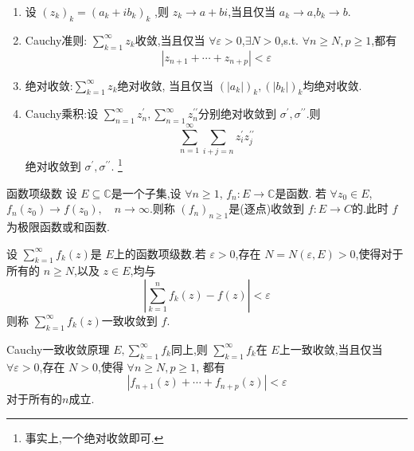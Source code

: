 \documentclass[../../复变函数.tex]{subfiles}
\begin{document}
\begin{proposition}
    \begin{enumerate}
        \item 设 \(  \left( z_{k} \right)_{k}= \left( a_{k}+ ib_{k} \right)_{k}    \) ,则 \(  z_{k}\to a+ bi  \),当且仅当 \(  a_{k}\to a  \),\(  b_{k}\to b  \).   
        \item {Cauchy准则}: \(  \sum _{k= 1}^{\infty}z_{k}  \)收敛,当且仅当 \(  \forall  \varepsilon > 0  \),\(  \exists N> 0  \),s.t. \(  \forall n\ge N, p\ge 1  \),都有 \[
        \left| z_{n+ 1}+ \cdots + z_{n+ p} \right|< \varepsilon  
        \]    
        \item 绝对收敛:\(  \sum _{k= 1}^{\infty}z_{k}  \)绝对收敛, 当且仅当 \(  \left( \left| a_{k} \right|  \right)_{k},\left( \left| b_{k} \right|  \right)  _{k}  \)均绝对收敛. 
        \item Cauchy乘积:设 \(  \sum _{n =  1}^{\infty}z_{n}^{\prime} , \sum _{n = 1}^{\infty} z_{n}^{\prime \prime}   \)分别绝对收敛到 \(   \sigma ^{\prime} , \sigma ^{\prime \prime}   \).则 \[
        \sum _{n = 1}^{\infty}\sum _{i+ j = n}z_{i}^{\prime} z_{j}^{\prime \prime} 
        \] 绝对收敛到 \(   \sigma ^{\prime} , \sigma ^{\prime \prime}   \). \footnote{事实上,一个绝对收敛即可.}
    \end{enumerate}
    
\end{proposition}


\begin{definition}{函数项级数}
    设 \(  E\subseteq \mathbb{C}   \)是一个子集,设 \(  \forall  n\ge 1  \), \(  f_{n}:E\to \mathbb{C}   \)是函数.   若 \(  \forall z_0 \in E  \), \(  f_{n}\left( z_0 \right)\to f\left( z_0 \right),\quad n\to \infty    \).则称 \(  \left( f_{n} \right)_{n\ge 1}   \)是(逐点)收敛到 \(  f:E\to C  \)的.此时 \(  f  \)为极限函数或和函数.     

\end{definition}

\begin{definition}
    设 \(  \sum _{k= 1}^{\infty}f_{k}\left( z \right)   \)是 \(  E  \)上的函数项级数.若 \(   \varepsilon > 0  \),存在 \(  N =  N\left(  \varepsilon ,E \right)> 0   \),使得对于所有的 \(  n\ge N  \),以及 \(  z \in E  \),均与 \[
    \left| \sum _{k= 1}^{n}f_{k}\left( z \right)-f\left( z \right)   \right|<  \varepsilon  
    \]则称 \(  \sum _{k= 1}^{\infty}f_{k}\left( z \right)   \)一致收敛到 \(  f  \).        
\end{definition}


\begin{theorem}{Cauchy一致收敛原理}
     \(  E, \sum _{k= 1}^{\infty}f_{k}  \)同上,则 \(  \sum _{k= 1}^{\infty}f_{k}  \)在 \(  E  \)上一致收敛,当且仅当 \(  \forall  \varepsilon > 0  \),存在 \(  N> 0  \),使得 \(  \forall n\ge N,p\ge 1  \),     都有 \[
     \left| f_{n+ 1}\left( z \right)+ \cdots + f_{n+ p}\left( z \right)   \right|<  \varepsilon  
     \]对于所有的\(  n  \)成立.  
\end{theorem}
\end{document}
